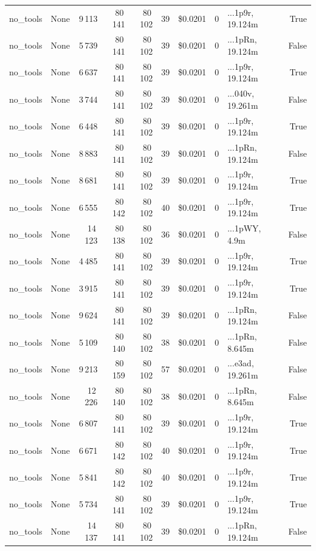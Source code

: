 \documentclass[a4paper,11pt]{article}
\begin{document}
\begin{table}[H]
{\begin{tabular}{l r r r r r r r l r}
no\_tools & None & 9\,113 & 80\,141 & 80\,102 & 39 & \$0.0201 & 0 & ...1p9r, 19.124m & True \\
no\_tools & None & 5\,739 & 80\,141 & 80\,102 & 39 & \$0.0201 & 0 & ...1pRn, 19.124m & False \\
no\_tools & None & 6\,637 & 80\,141 & 80\,102 & 39 & \$0.0201 & 0 & ...1p9r, 19.124m & True \\
no\_tools & None & 3\,744 & 80\,141 & 80\,102 & 39 & \$0.0201 & 0 & ...040v, 19.261m & False \\
no\_tools & None & 6\,448 & 80\,141 & 80\,102 & 39 & \$0.0201 & 0 & ...1p9r, 19.124m & True \\
no\_tools & None & 8\,883 & 80\,141 & 80\,102 & 39 & \$0.0201 & 0 & ...1pRn, 19.124m & False \\
no\_tools & None & 8\,681 & 80\,141 & 80\,102 & 39 & \$0.0201 & 0 & ...1p9r, 19.124m & True \\
no\_tools & None & 6\,555 & 80\,142 & 80\,102 & 40 & \$0.0201 & 0 & ...1p9r, 19.124m & True \\
no\_tools & None & 14\,123 & 80\,138 & 80\,102 & 36 & \$0.0201 & 0 & ...1pWY, 4.9m & False \\
no\_tools & None & 4\,485 & 80\,141 & 80\,102 & 39 & \$0.0201 & 0 & ...1p9r, 19.124m & True \\
no\_tools & None & 3\,915 & 80\,141 & 80\,102 & 39 & \$0.0201 & 0 & ...1p9r, 19.124m & True \\
no\_tools & None & 9\,624 & 80\,141 & 80\,102 & 39 & \$0.0201 & 0 & ...1pRn, 19.124m & False \\
no\_tools & None & 5\,109 & 80\,140 & 80\,102 & 38 & \$0.0201 & 0 & ...1pRn, 8.645m & False \\
no\_tools & None & 9\,213 & 80\,159 & 80\,102 & 57 & \$0.0201 & 0 & ...e3ad, 19.261m & False \\
no\_tools & None & 12\,226 & 80\,140 & 80\,102 & 38 & \$0.0201 & 0 & ...1pRn, 8.645m & False \\
no\_tools & None & 6\,807 & 80\,141 & 80\,102 & 39 & \$0.0201 & 0 & ...1p9r, 19.124m & True \\
no\_tools & None & 6\,671 & 80\,142 & 80\,102 & 40 & \$0.0201 & 0 & ...1p9r, 19.124m & True \\
no\_tools & None & 5\,841 & 80\,142 & 80\,102 & 40 & \$0.0201 & 0 & ...1p9r, 19.124m & True \\
no\_tools & None & 5\,734 & 80\,141 & 80\,102 & 39 & \$0.0201 & 0 & ...1p9r, 19.124m & True \\
no\_tools & None & 14\,137 & 80\,141 & 80\,102 & 39 & \$0.0201 & 0 & ...1pRn, 19.124m & False \\

\end{tabular}}
\end{table}
\end{document}
